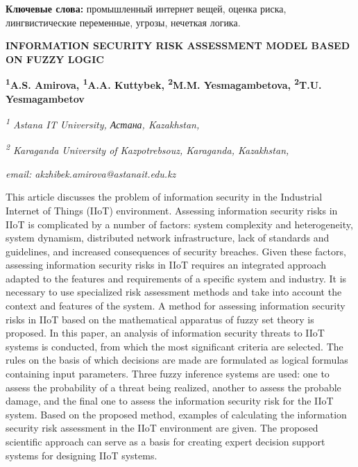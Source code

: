 {\bfseries Ключевые слова:} промышленный интернет вещей, оценка риска,
лингвистические переменные, угрозы, нечеткая логика.

\begin{articleheader}
{\bfseries INFORMATION SECURITY RISK ASSESSMENT MODEL BASED ON FUZZY LOGIC}

{\bfseries
\textsuperscript{1}A.S. Amirova\textsuperscript{\envelope },
\textsuperscript{1}A.A. Kuttybek,
\textsuperscript{2}M.M. Yesmagambetova,
\textsuperscript{2}T.U. Yesmagambetov}
\end{articleheader}

\begin{affiliation}
{\em \textsuperscript{1} Astana IT University, Астана, Kazakhstan,}

{\em \textsuperscript{2} Karaganda University of Kazpotrebsouz, Karaganda, Kazakhstan,}

{\em email: akzhibek.amirova@astanait.edu.kz}
\end{affiliation}

This article discusses the problem of information security in the
Industrial Internet of Things (IIoT) environment. Assessing information
security risks in IIoT is complicated by a number of factors: system
complexity and heterogeneity, system dynamism, distributed network
infrastructure, lack of standards and guidelines, and increased
consequences of security breaches. Given these factors, assessing
information security risks in IIoT requires an integrated approach
adapted to the features and requirements of a specific system and
industry. It is necessary to use specialized risk assessment methods and
take into account the context and features of the system. A method for
assessing information security risks in IIoT based on the mathematical
apparatus of fuzzy set theory is proposed. In this paper, an analysis of
information security threats to IIoT systems is conducted, from which
the most significant criteria are selected. The rules on the basis of
which decisions are made are formulated as logical formulas containing
input parameters. Three fuzzy inference systems are used: one to assess
the probability of a threat being realized, another to assess the
probable damage, and the final one to assess the information security
risk for the IIoT system. Based on the proposed method, examples of
calculating the information security risk assessment in the IIoT
environment are given. The proposed scientific approach can serve as a
basis for creating expert decision support systems for designing IIoT
systems.

